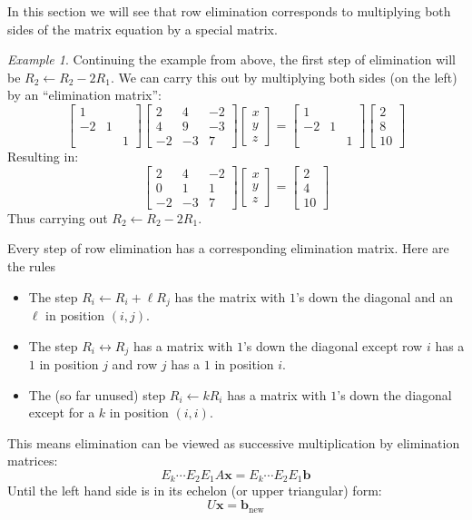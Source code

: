 \documentclass[11pt,oneside]{amsbook}
\theoremstyle{definition}
\theoremstyle{plain}
\theoremstyle{definition}
\theoremstyle{remark}
\newtheorem{example}[theorem]{Example}
\numberwithin{equation}{section}
\numberwithin{figure}{section}
\begin{document}
In this section we will see that row elimination corresponds to multiplying both sides of the matrix equation by a special matrix.

\begin{example}
  Continuing the example from above, the first step of elimination will be $R_2\leftarrow R_2-2R_1$. We can carry this out by multiplying both sides (on the left) by an ``elimination matrix'':
  \[\begin{bmatrix}1&&\\-2&1&\\&&1\end{bmatrix}
    \begin{bmatrix}2&4&-2\\4&9&-3\\-2&-3&7\end{bmatrix}
    \begin{bmatrix}x\\y\\z\end{bmatrix}
    =\begin{bmatrix}1&&\\-2&1&\\&&1\end{bmatrix}
    \begin{bmatrix}2\\8\\10\end{bmatrix}
  \]
  Resulting in:
  \[\begin{bmatrix}2&4&-2\\0&1&1\\-2&-3&7\end{bmatrix}
    \begin{bmatrix}x\\y\\z\end{bmatrix}
    =\begin{bmatrix}2\\4\\10\end{bmatrix}
  \]
  Thus carrying out $R_2\leftarrow R_2-2R_1$.
\end{example}

Every step of row elimination has a corresponding elimination matrix. Here are the rules
\begin{itemize}
  \item The step $R_i\leftarrow R_i+\ell R_j$ has the matrix with $1$'s down the diagonal and an $\ell$ in position $(i,j)$.
  \item The step $R_i\leftrightarrow R_j$ has a matrix with $1$'s down the diagonal except row $i$ has a $1$ in position $j$ and row $j$ has a $1$ in position $i$.
  \item The (so far unused) step $R_i\leftarrow kR_i$ has a matrix with $1$'s down the diagonal except for a $k$ in position $(i,i)$.
\end{itemize}
This means elimination can be viewed as successive multiplication by elimination matrices:
\[E_k\cdots E_2E_1A\bm{x}=E_k\cdots E_2E_1\bm{b}
\]
Until the left hand side is in its echelon (or upper triangular) form:
\[U\bm{x}=\bm{b}_{\text{new}}
\]
\end{document}
